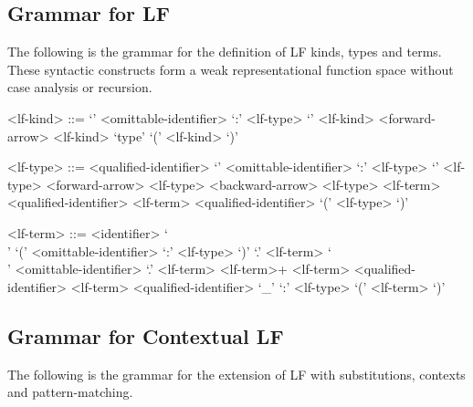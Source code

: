 \subsection{Grammar for \acs{LF}}\label{section:syntax-lf}

The following is the grammar for the definition of \ac{LF} kinds, types and terms.
These syntactic constructs form a weak representational function space without case analysis or recursion.

\begin{grammar}
<lf-kind> ::= `{' <omittable-identifier> `:' <lf-type> `}' <lf-kind>
 <forward-arrow> <lf-kind>
\alt `type'
\alt `(' <lf-kind> `)'

<lf-type> ::= <qualified-identifier>
\alt `{' <omittable-identifier> `:' <lf-type> `}' <lf-type>
 <forward-arrow> <lf-type>
 <backward-arrow> <lf-type>
 <lf-term>
 <qualified-identifier> <lf-term>
 <qualified-identifier>
\alt `(' <lf-type> `)'

<lf-term> ::= <identifier>
\alt `\\' `(' <omittable-identifier> `:' <lf-type> `)' `.' <lf-term>
\alt `\\' <omittable-identifier> `.' <lf-term>
 <lf-term>+
 <lf-term>
 <qualified-identifier> <lf-term>
 <qualified-identifier>
\alt `_'
 `:' <lf-type>
\alt `(' <lf-term> `)'
\end{grammar}

\subsection{Grammar for Contextual \acs{LF}}\label{section:syntax-contextual-lf}

The following is the grammar for the extension of \ac{LF} with substitutions, contexts and pattern-matching.

